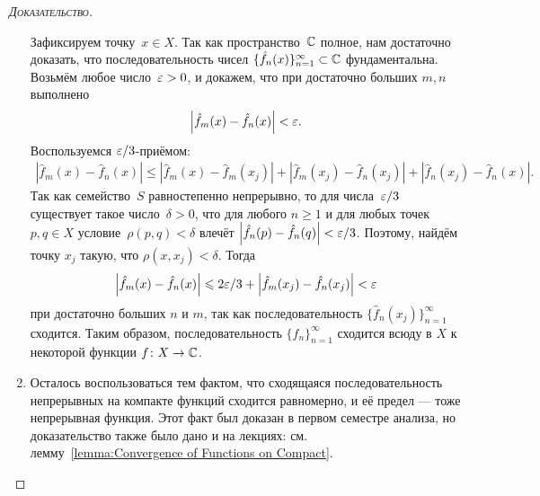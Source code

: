 \documentclass[../complex-analysis.tex]{subfiles}
\begin{document}
\begin{proof}[\normalfont\textsc{Доказательство}]
\begin{enumerate}
   Зафиксируем точку~$ x \in X $. Так как пространство~$ \mathbb{C} $  полное, нам достаточно доказать, что последовательность чисел $\{\hat f_{n}(x)\}_{n=1}^{\infty} \subset \mathbb{C}$  фундаментальна. Возьмём любое число~$ \varepsilon > 0 $, и докажем, что при достаточно больших $ m,n $ выполнено
   \begin{align*}
    \left| \hat f_m(x) - \hat f_n(x) \right| < \varepsilon.
   \end{align*} Воспользуемся $ \varepsilon / 3 $-приёмом:
   \begin{align*}
    \left| \hat f_m(x) - \hat f_n(x) \right| \leqslant \left| \hat f_m(x) - \hat f_m(x_j) \right| + \left| \hat f_m(x_j) - \hat f_n(x_j) \right| + \left| \hat f_n(x_j) - \hat f_n(x) \right|.
   \end{align*} Так как семейство~$ S $ равностепенно непрерывно, то для числа~$ \varepsilon / 3 $ существует такое число~$ \delta>0 $, что для любого $ n \geqslant 1 $ и для любых точек~$ p,q \in X $ условие~$ \rho(p,q) < \delta $ влечёт $ \left| \hat f_n(p) - \hat f_n(q) \right| < \varepsilon / 3$. Поэтому, найдём точку $ x_j $ такую, что $ \rho(x,x_j) < \delta $. Тогда
   \begin{align*}
    \left| \hat f_m(x) - \hat f_n(x) \right| \leqslant 2\varepsilon / 3 + \left| \hat f_m(x_j) - \hat f_n(x_j) \right| < \varepsilon
   \end{align*} при достаточно больших $ n $ и $ m $, так как последовательность $\{\hat f_{n}(x_j)\}_{n=1}^{\infty} $  сходится. Таким образом, последовательность $ \{\hat f_{n}\}_{n=1}^{\infty}  $ сходится всюду в $ X $ к некоторой функции $ f \colon X \to \mathbb{C} $.

  \item Осталось воспользоваться тем фактом, что сходящаяся последовательность непрерывных на компакте функций сходится равномерно, и её предел --- тоже непрерывная функция. Этот факт был доказан в первом семестре анализа, но доказательство также было дано и на лекциях: см. лемму~\ref{lemma:Convergence of Functions on Compact}.
 \end{enumerate}
\end{proof}
\end{document}
